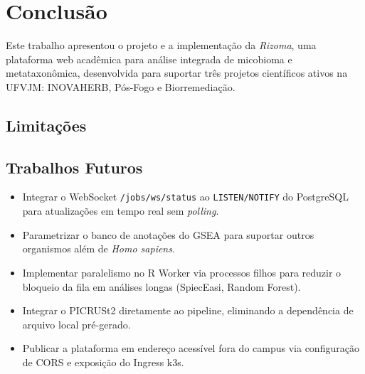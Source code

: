 \chapter{Conclusão}
\label{cap:conclusao}


Este trabalho apresentou o projeto e a implementação da
\textit{Rizoma}, uma plataforma web acadêmica para análise
integrada de micobioma e metataxonômica, desenvolvida para suportar
três projetos científicos ativos na UFVJM: INOVAHERB, Pós-Fogo e
Biorremediação.


\section{Limitações}


\section{Trabalhos Futuros}

\begin{itemize}
  \item Integrar o WebSocket \texttt{/jobs/ws/status} ao
        \texttt{LISTEN/NOTIFY} do PostgreSQL para atualizações em
        tempo real sem \textit{polling}.
  \item Parametrizar o banco de anotações do GSEA para suportar
        outros organismos além de \textit{Homo sapiens}.
  \item Implementar paralelismo no R Worker via processos filhos
        para reduzir o bloqueio da fila em análises longas (SpiecEasi,
        Random Forest).
  \item Integrar o PICRUSt2 diretamente ao pipeline, eliminando
        a dependência de arquivo local pré-gerado.
  \item Publicar a plataforma em endereço acessível fora do campus
        via configuração de CORS e exposição do Ingress k3s.
\end{itemize}
